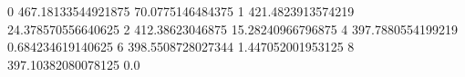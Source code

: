 0 467.18133544921875 70.0775146484375
1 421.4823913574219 24.378570556640625
2 412.38623046875 15.28240966796875
4 397.7880554199219 0.684234619140625
6 398.5508728027344 1.447052001953125
8 397.10382080078125 0.0
